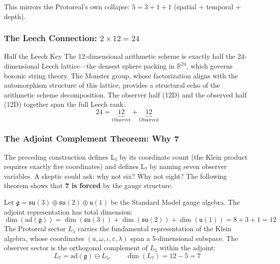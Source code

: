 This mirrors the Protoreal's own collapse: $5 = 3 + 1 + 1$ (spatial + temporal + depth).

\subsubsection{The Leech Connection: $2 \times 12 = 24$}

\begin{arithmetic schemebox}{Half the Leech Key}
The 12-dimensional arithmetic scheme is exactly half the 24-dimensional Leech lattice---the densest sphere packing in $\mathbb{R}^{24}$, which governs bosonic string theory. The Monster group, whose factorization aligns with the automorphism structure of this lattice, provides a structural echo of the arithmetic scheme decomposition. The observer half (12D) and the observed half (12D) together span the full Leech rank:
\begin{equation}
    24 = \underbrace{12}_{\text{Observer}} + \underbrace{12}_{\text{Observed}}
\end{equation}
\end{arithmetic schemebox}

\subsubsection{The Adjoint Complement Theorem: Why 7}

The preceding construction defines L₅ by its coordinate count (the Klein product requires exactly five coordinates) and defines L₇ by naming seven observer variables. A skeptic could ask: why not six? Why not eight? The following theorem shows that \textbf{7 is forced} by the gauge structure.

\begin{theorem}\label{thm:adjoint_complement}
Let $\mathfrak{g} = \mathfrak{su}(3) \oplus \mathfrak{su}(2) \oplus \mathfrak{u}(1)$ be the Standard Model gauge algebra. The adjoint representation has total dimension:
$$\dim(\mathrm{ad}(\mathfrak{g})) = \dim(\mathfrak{su}(3)) + \dim(\mathfrak{su}(2)) + \dim(\mathfrak{u}(1)) = 8 + 3 + 1 = 12$$
The Protoreal sector $L_5$ carries the fundamental representation of the Klein algebra, whose coordinates $(a, \omega, \iota, \varepsilon, \lambda)$ span a 5-dimensional subspace. The observer sector is the orthogonal complement of $L_5$ within the adjoint:
\begin{equation}
    L_7 = \mathrm{ad}(\mathfrak{g}) \ominus L_5, \qquad \dim(L_7) = 12 - 5 = 7
\end{equation}
\end{theorem}

